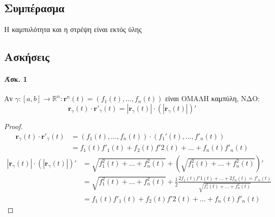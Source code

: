 \documentclass[11pt,a4paper,titlepage]{article}
\begin{document}
\subsection{Συμπέρασμα}
\begin{attnbox}{}
Η καμπυλότητα και η στρέψη είναι εκτός ύλης
\end{attnbox}

\subsection{Ασκήσεις}
\paragraph{Άσκ. 1}
Αν \(\gamma:[a,b] \to  \mathbb R ^n: \mathbf r^n (t)
= \left( f_1(t),\dots,f_n(t) \right) \) είναι ΟΜΑΛΗ καμπύλη, ΝΔΟ:
\[
\mathbf r_\gamma (t) \cdot \mathbf r' _\gamma(t) = |\mathbf r _\gamma (t)| \cdot
\left( |\mathbf r_\gamma(t)| \right)'
\]
\begin{proof}
\begin{align*}
 \mathbf r_\gamma(t) \cdot   \mathbf r'_\gamma(t)
 &= \left( f_1(t),\dots ,f_n(t) \right) \cdot \left( f_1'(t),\dots,f'_n(t) \right) \\
&= f_1(t)f'_1(t)+f_2(t)f'2(t)+\dots+f_n(t)f'_n(t)
\end{align*}
\begin{align*}
 |\mathbf r _\gamma (t)| \cdot \left( |\mathbf r_\gamma(t)| \right)'
 &= \sqrt{f_1^2(t) + \dots + f_n^2(t)} + \left( \sqrt{f_1^2(t) + \dots + f_n^2(t)} \right)' \\
 &= \sqrt{f_1^2(t) + \dots + f_n^2(t)} + \frac{1}{2} \frac{2f_1(t)f'1(t)+\dots+2f_n(t)=f'_n(t)}{\sqrt{f_1^2(t) + \dots + f_n^2(t)}} \\
 &= f_1(t)f'_1(t)+f_2(t)f'2(t)+\dots+f_n(t)f'_n(t)
\end{align*}
\end{proof}
\end{document}
